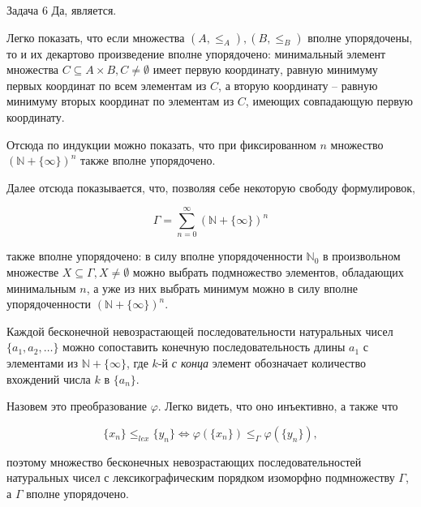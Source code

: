 \documentclass{article}
\newcommand{\N}{\mathbb{N}}
\begin{document}
	\begin{section}{Задача 6}
		Да, является.

		Легко показать, что если множества $(A, \le_A), (B, \le_B)$ вполне упорядочены, то и их декартово произведение вполне упорядочено: минимальный элемент множества $C \subseteq A \times B, C \ne \emptyset$ имеет первую координату, равную минимуму первых координат по всем элементам из $C$, а вторую координату -- равную минимуму вторых координат по элементам из $C$, имеющих совпадающую первую координату.

		Отсюда по индукции можно показать, что при фиксированном $n$ множество $(\N + \{\infty\})^n$ также вполне упорядочено.

		Далее отсюда показывается, что, позволяя себе некоторую свободу формулировок,

		\begin{equation*}
			\Gamma = \sum_{n=0}^\infty (\N + \{\infty\})^n
		\end{equation*}

		также вполне упорядочено: в силу вполне упорядоченности $\N_0$ в произвольном множестве $X \subseteq \Gamma, X \ne \emptyset$ можно выбрать подмножество элементов, обладающих минимальным $n$, а уже из них выбрать минимум можно в силу вполне упорядоченности $(\N + \{\infty\})^n$.

		Каждой бесконечной невозрастающей последовательности натуральных чисел $\{a_1, a_2, \dots\}$ можно сопоставить конечную последовательность длины $a_1$ с элементами из $\N + \{\infty\}$, где $k$-й \textit{с конца} элемент обозначает количество вхождений числа $k$ в $\{a_n\}$.

		Назовем это преобразование $\varphi$. Легко видеть, что оно инъективно, а также что

		\begin{equation*}
			\{x_n\} \le_{lex} \{y_n\} \iff \varphi(\{x_n\}) \le_\Gamma \varphi(\{y_n\}),
		\end{equation*}

		поэтому множество бесконечных невозрастающих последовательностей натуральных чисел с лексикографическим порядком изоморфно подмножеству $\Gamma$, а $\Gamma$ вполне упорядочено.
	\end{section}
\end{document}
